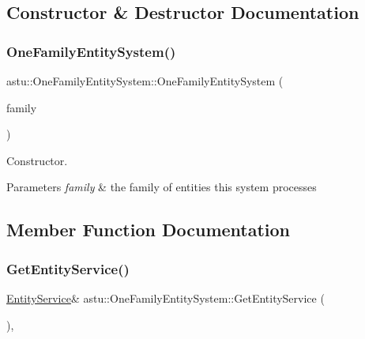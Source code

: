 \subsection{Constructor \& Destructor Documentation}
\mbox{\label{classastu_1_1OneFamilyEntitySystem_a97f5065181149d2651366867a3ffd884}} 
\subsubsection{\texorpdfstring{One\+Family\+Entity\+System()}{OneFamilyEntitySystem()}}
{\footnotesize\ttfamily astu\+::\+One\+Family\+Entity\+System\+::\+One\+Family\+Entity\+System (\begin{DoxyParamCaption}\item[{const \hyperlink{classastu_1_1EntityFamily}{Entity\+Family} \&}]{family }\end{DoxyParamCaption})\hspace{0.3cm}{\ttfamily [inline]}}

Constructor.


\begin{DoxyParams}{Parameters}
{\em family} & the family of entities this system processes \\
\hline
\end{DoxyParams}


\subsection{Member Function Documentation}
\mbox{\label{classastu_1_1OneFamilyEntitySystem_a7ad12fc482483a0c895baa8636d49fe0}} 
\subsubsection{\texorpdfstring{Get\+Entity\+Service()}{GetEntityService()}}
{\footnotesize\ttfamily \hyperlink{classastu_1_1EntityService}{Entity\+Service}\& astu\+::\+One\+Family\+Entity\+System\+::\+Get\+Entity\+Service (\begin{DoxyParamCaption}{ }\end{DoxyParamCaption})\hspace{0.3cm}{\ttfamily [inline]}, {\ttfamily [protected]}}

